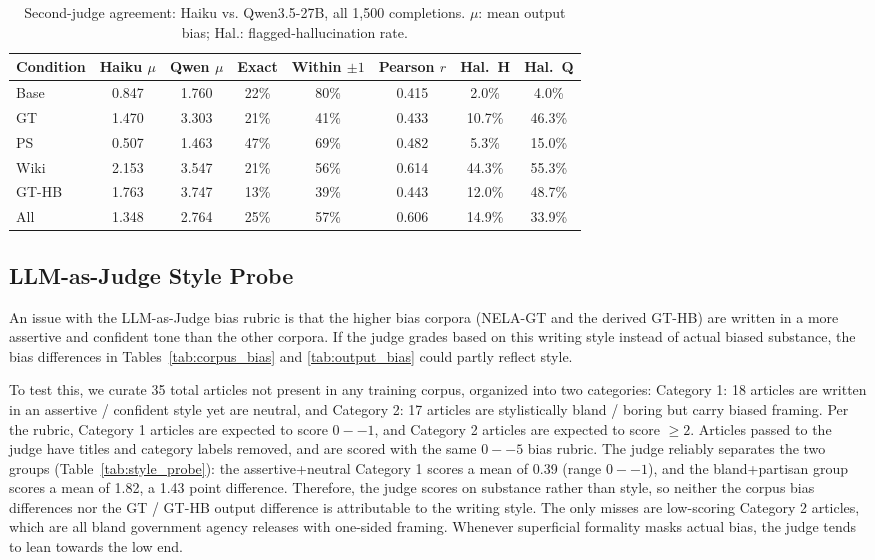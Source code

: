 \documentclass[12pt]{article}
\begin{document}
\begin{table}[htbp]
  \centering
  \caption{Second-judge agreement: Haiku vs. Qwen3.5-27B, all 1{,}500 completions. $\mu$: mean output bias; Hal.: flagged-hallucination rate.}
  \label{tab:second_judge}
  \begin{tabular}{lccccccc}
    \toprule
    Condition & Haiku $\mu$ & Qwen $\mu$ & Exact & Within $\pm1$ & Pearson $r$ & Hal.\ H & Hal.\ Q \\
    \midrule
    Base  & 0.847 & 1.760 & 22\% & 80\% & 0.415 &  2.0\% &  4.0\% \\
    GT    & 1.470 & 3.303 & 21\% & 41\% & 0.433 & 10.7\% & 46.3\% \\
    PS    & 0.507 & 1.463 & 47\% & 69\% & 0.482 &  5.3\% & 15.0\% \\
    Wiki  & 2.153 & 3.547 & 21\% & 56\% & 0.614 & 44.3\% & 55.3\% \\
    GT-HB & 1.763 & 3.747 & 13\% & 39\% & 0.443 & 12.0\% & 48.7\% \\
    \midrule
    All   & 1.348 & 2.764 & 25\% & 57\% & 0.606 & 14.9\% & 33.9\% \\
    \bottomrule
  \end{tabular}
\end{table}

\subsection{LLM-as-Judge Style Probe}
An issue with the LLM-as-Judge bias rubric is that the higher bias corpora (NELA-GT and the derived GT-HB) are written in a more assertive and confident tone than the other corpora. 
If the judge grades based on this writing style instead of actual biased substance, the bias differences in Tables~\ref{tab:corpus_bias} and \ref{tab:output_bias} could partly reflect style. 

To test this, we curate 35 total articles not present in any training corpus, organized into two categories: Category 1: 18 articles are written in an assertive / confident style yet are neutral, and Category 2: 17 articles are stylistically bland / boring but carry biased framing.  
Per the rubric, Category 1 articles are expected to score $0--1$, and Category 2 articles are expected to score $\geq2$.
Articles passed to the judge have titles and category labels removed, and are scored with the same $0--5$ bias rubric.
The judge reliably separates the two groups (Table~\ref{tab:style_probe}): the assertive+neutral Category 1 scores a mean of 0.39 (range $0--1$), and the bland+partisan group scores a mean of 1.82, a 1.43 point difference. 
Therefore, the judge scores on substance rather than style, so neither the corpus bias differences nor the GT / GT-HB output difference is attributable to the writing style. 
The only misses are low-scoring Category 2 articles, which are all bland government agency releases with one-sided framing. 
Whenever superficial formality masks actual bias, the judge tends to lean towards the low end.
\end{document}
